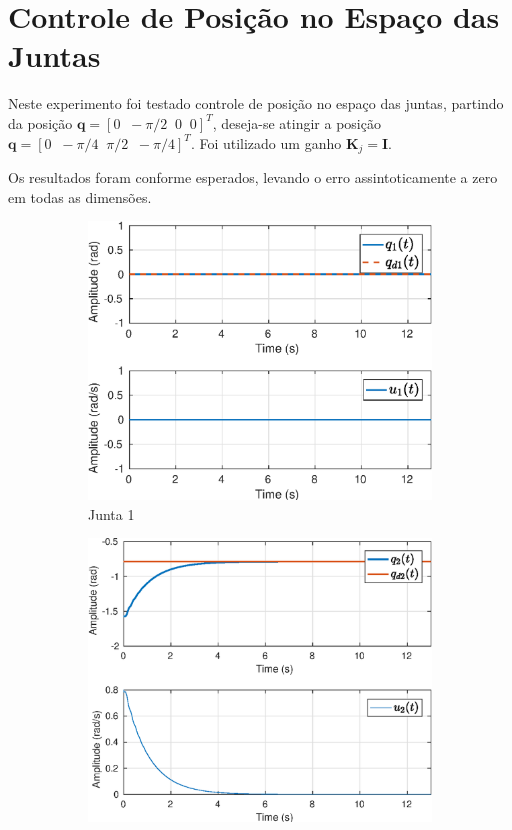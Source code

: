 	

\section{Controle de Posição no Espaço das Juntas}

Neste experimento foi testado controle de posição no espaço das juntas, partindo da posição $\bm{q} =[ 0 \;\; -\pi/2 \;\; 0 \;\; 0]^T$, deseja-se atingir a posição $\bm{q} =[ 0 \;\; -\pi/4 \;\; \pi/2  \;\; -\pi/4]^T$. Foi utilizado um ganho $\bm{K}_j = \bm{I}$.

Os resultados foram conforme esperados, levando o erro assintoticamente a zero em todas as dimensões.

\begin{figure}[H]
\centering
\begin{subfigure}{.5\textwidth}
  \centering
  \includegraphics[width=\linewidth]{./img/joint_test1/q1.eps}
  \caption{Junta 1}
  \label{fig:sub1}
\end{subfigure}%
\begin{subfigure}{.5\textwidth}
  \centering
  \includegraphics[width=\linewidth]{./img/joint_test1/q2.eps}

\end{subfigure}
\end{figure}

